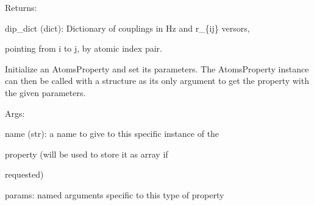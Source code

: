\documentclass[letterpaper,10pt,english]{sphinxmanual}
\begin{document}
\begin{fulllineitems}
\begin{DUlineblock}{0em}
\item[] Returns: 
\item[]
\begin{DUlineblock}{\DUlineblockindent}
\item[] dip\_dict (dict): Dictionary of couplings in Hz and r\_\{ij\} versors,
\item[]
\begin{DUlineblock}{\DUlineblockindent}
\item[] pointing from i to j, by atomic index pair.
\end{DUlineblock}
\end{DUlineblock}
\end{DUlineblock}

Initialize an AtomsProperty and set its parameters.
The AtomsProperty instance can then be called with a structure as its
only argument to get the property with the given parameters.

\begin{DUlineblock}{0em}
\item[] Args:
\item[]
\begin{DUlineblock}{\DUlineblockindent}
\item[] name (str): a name to give to this specific instance of the
\item[]
\begin{DUlineblock}{\DUlineblockindent}
\item[] property (will be used to store it as array if
\item[] requested)
\end{DUlineblock}
\item[] params: named arguments specific to this type of property
\end{DUlineblock}
\end{DUlineblock}

\begin{fulllineitems}
\label{doctree/soprano.properties.nmr.dipolar:soprano.properties.nmr.dipolar.DipolarCoupling.default_name}
\end{fulllineitems}


\begin{fulllineitems}
\label{doctree/soprano.properties.nmr.dipolar:soprano.properties.nmr.dipolar.DipolarCoupling.default_params}
\end{fulllineitems}


\end{fulllineitems}
\end{document}
